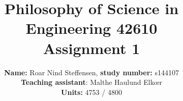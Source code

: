 \title{Philosophy of Science in Engineering 42610\\
Assignment 1}
\author{\textbf{Name:} Roar Nind Steffensen, \textbf{study number:} s144107\\
\textbf{Teaching assistant}: Malthe Haulund Elk{\oe}r\\
\textbf{Units:} 4753 / 4800}